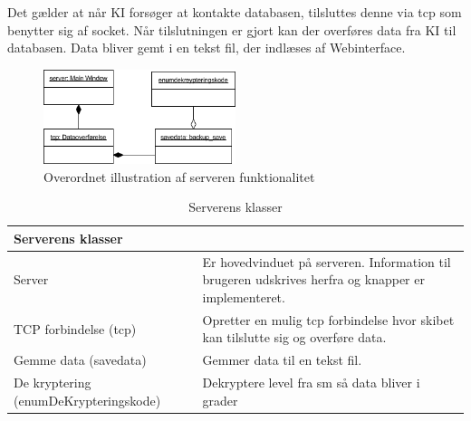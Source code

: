 Det gælder at når KI forsøger at kontakte databasen, tilsluttes denne via tcp som benytter sig af socket. Når tilslutningen er gjort kan der overføres data fra KI til databasen. Data bliver gemt i en tekst fil, der indlæses af Webinterface.
\begin{figure}[H]
\centering
\includegraphics[width = 0.5\textwidth]{billeder/database_server}
\caption{Overordnet illustration af serveren funktionalitet}
\label{fig:database_server}
\end{figure}

\begin{table}[H]
\centering
\begin{tabular}{p{4cm} p{10cm}}
\multicolumn{2}{l}{{\Large Serverens klasser}} \\\hline
Server & Er hovedvinduet på serveren. Information til brugeren udskrives herfra og knapper er implementeret. \\
TCP forbindelse (tcp) & Opretter en mulig tcp forbindelse hvor skibet kan tilslutte sig og overføre data.\\
Gemme data (savedata) & Gemmer data til en tekst fil.\\
De kryptering (enumDeKrypteringskode) & Dekryptere level fra sm så data bliver i grader\\
\end{tabular}
\caption{Serverens klasser}
\label{tabel:server-klasser}
\end{table}

